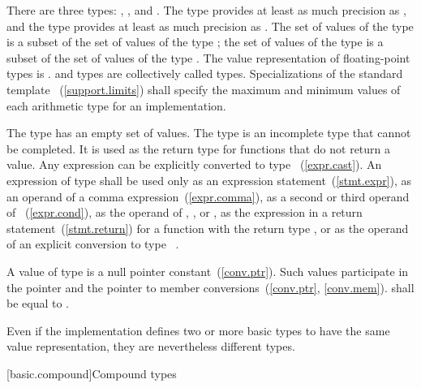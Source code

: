 \pnum
{}%
There are three  types:
%
,
%
,
and
%
. The type  provides at least as much
precision as , and the type  provides at
least as much precision as . The set of values of the type
 is a subset of the set of values of the type
; the set of values of the type  is a subset
of the set of values of the type  . The value
representation of floating-point types is .
%
%
 and  types are collectively
called  types.
%
Specializations of the standard template
~(\ref{support.limits}) shall specify the
maximum and minimum values of each arithmetic type for an
implementation.

\pnum
{}%
The  type has an empty set of values. The  type
is an incomplete type that cannot be completed. It is used as the return
type for functions that do not return a value. Any expression can be
explicitly converted to type 
~(\ref{expr.cast}). An expression of type  shall
be used only as an expression statement~(\ref{stmt.expr}), as an operand
of a comma expression~(\ref{expr.comma}), as a second or third operand
of ~(\ref{expr.cond}), as the operand of
, , or , as
the expression in a return statement~(\ref{stmt.return}) for a function
with the return type , or as the operand of an explicit conversion
to type \cv\ .

\pnum
A value of type  is a null pointer
constant~(\ref{conv.ptr}). Such values participate in the pointer and the
pointer to member conversions~(\ref{conv.ptr}, \ref{conv.mem}).
 shall be equal to .

\pnum
\enternote 
Even if the implementation defines two or more basic types to have the
same value representation, they are nevertheless different types.
\exitnote 

[basic.compound]{Compound types}


